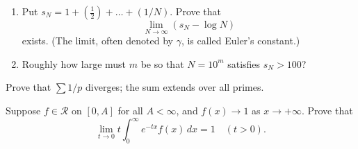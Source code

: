   \begin{exercise}[Rudin 8.9]
    \begin{enumerate}
      \item Put $s_N = 1 + (\frac{1}{2}) + \dots + (1/N)$. Prove that
        \begin{equation}
          \lim_{N \to \infty} (s_N - \log N)
        \end{equation}
        exists. (The limit, often denoted by $\gamma$, is called Euler's constant.)
      \item Roughly how large must $m$ be so that $N = 10^m$ satisfies $s_N > 100$?
    \end{enumerate}
  \end{exercise}
  \begin{solution}

  \end{solution}

  \begin{exercise}[Rudin 8.10]
    Prove that $\sum 1/p$ diverges; the sum extends over all primes.
  \end{exercise}
  \begin{solution}

  \end{solution}

  \begin{exercise}[Rudin 8.11]
    Suppose $f \in \mathscr{R}$ on $[0, A]$ for all $A < \infty$, and $f(x) \to 1$ as $x \to +\infty$. Prove that
    \begin{equation}
      \lim_{t \to 0} t \int_0^\infty e^{-tx} f(x) \, dx = 1 \quad (t > 0).
    \end{equation}
  \end{exercise}
  \begin{solution}

  \end{solution}


